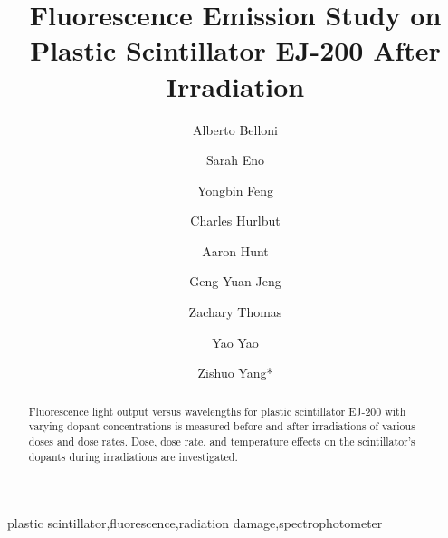 \documentclass[preprint]{elsarticle}
\begin{document}
\begin{frontmatter}



\title{Fluorescence Emission Study on Plastic Scintillator EJ-200 After Irradiation}


\author[umd]{Alberto Belloni}
\author[umd]{Sarah Eno}
\author[umd]{Yongbin Feng}
\author[eljen]{Charles Hurlbut}
\author[umd]{Aaron Hunt}
\author[umd]{Geng-Yuan Jeng}
\author[umd]{Zachary Thomas}
\author[umd]{Yao Yao}
\author[umd]{Zishuo Yang*}

\address[umd]{Department of Physics, University of Maryland, College Park, MD 20740, USA}
\address[eljen]{Eljen Technology, 1300 W. Broadway, Sweetwater, TX 79556, USA}

\begin{abstract}
Fluorescence light output versus wavelengths for plastic scintillator EJ-200 with varying dopant concentrations is measured 
before and after irradiations of various doses and dose rates. 
Dose, dose rate, and temperature effects on the scintillator's dopants during irradiations are investigated.
\end{abstract}

\begin{keyword}
plastic scintillator\sep fluorescence\sep radiation damage\sep spectrophotometer

\end{keyword}

\end{frontmatter}
\end{document}
